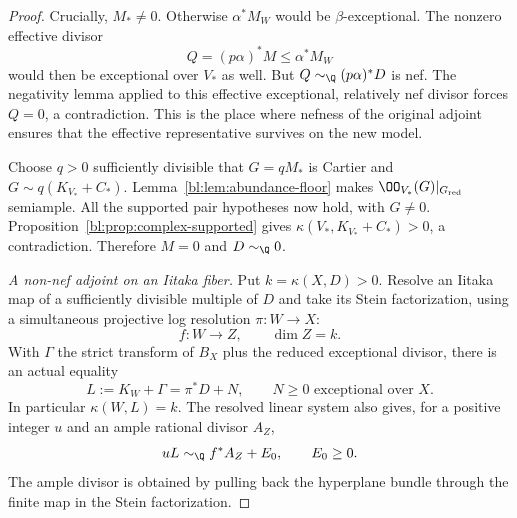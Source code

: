\begin{proof}
Crucially, $M_*\ne0$.  Otherwise $\alpha^*M_W$ would be
$\beta$-exceptional.  The nonzero effective divisor
\[
 Q=(p\alpha)^*M\leq\alpha^*M_W
\]
would then be exceptional over $V_*$ as well.  But
$Q\sim_{\Q}(p\alpha)^*D$ is nef.  The negativity lemma applied
to this effective exceptional, relatively nef divisor forces
$Q=0$, a contradiction.  This is the place where nefness of the
original adjoint ensures that the effective representative
survives on the new model.

Choose $q>0$ sufficiently divisible that $G=qM_*$ is Cartier and
$G\sim q(K_{V_*}+C_*)$.  Lemma~\ref{bl:lem:abundance-floor} makes
$\OO_{V_*}(G)|_{G_{\mathrm{red}}}$ semiample.  All the supported
pair hypotheses now hold, with $G\ne0$.  Proposition~\ref{bl:prop:complex-supported}
gives $\kappa(V_*,K_{V_*}+C_*)>0$, a contradiction.  Therefore
$M=0$ and $D\sim_{\Q}0$.

\smallskip\noindent
\emph{A non-nef adjoint on an Iitaka fiber.}
Put $k=\kappa(X,D)>0$.  Resolve an Iitaka map of a sufficiently
divisible multiple of $D$ and take its Stein factorization,
using a simultaneous projective log resolution $\pi:W\to X$:
\[
 f:W\longrightarrow Z,\qquad \dim Z=k.
\]
With $\Gamma$ the strict transform of $B_X$ plus the reduced
exceptional divisor, there is an actual equality
\begin{equation}
 L:=K_W+\Gamma=\pi^*D+N,
 \qquad N\geq0\text{ exceptional over }X.
 \label{bl:eq:abundance-nonnef-adjoint}
\end{equation}
In particular $\kappa(W,L)=k$.  The resolved linear system also
gives, for a positive integer $u$ and an ample rational divisor
$A_Z$,
\begin{equation}
 uL\sim_{\Q}f^*A_Z+E_0,\qquad E_0\geq0.
 \label{bl:eq:abundance-iitaka-bound}
\end{equation}
The ample divisor is obtained by pulling back the hyperplane
bundle through the finite map in the Stein factorization.


\end{proof}
